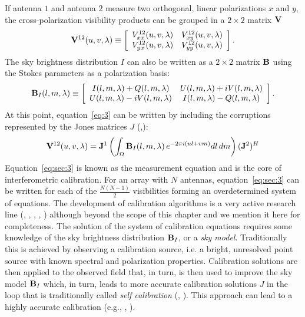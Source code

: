 If antenna $1$ and antenna $2$ measure two orthogonal, linear polarizations $x$ and $y$, the cross-polarization visibility products can be grouped in a $2 \times 2$ matrix ${\bf V}$
\begin{equation}
    {\bf V}^{12} (u,v,\lambda) \equiv 
    \left[ 
    \begin{array}{cc}
    V_{xx}^{12} (u,v,\lambda) & V_{xy}^{12} (u,v,\lambda) \\
    V_{yx}^{12} (u,v,\lambda) & V_{yy}^{12} (u,v,\lambda) \\
    \end{array}
    \right].   
\label{eq:sec:1}
\end{equation} 
The sky brightness distribution $I$ can also be written as a $2 \times 2$ matrix ${\bf B}$ using the Stokes parameters as a polarization basis:
\begin{equation}
    {\bf B}_I (l,m,\lambda) \equiv 
    \left[
    \begin{array}{cc}
    I (l,m,\lambda) + Q (l,m,\lambda) & U (l,m,\lambda) + iV (l,m,\lambda) \\
    U (l,m,\lambda) - iV (l,m,\lambda) & I (l,m,\lambda) - Q (l,m,\lambda) \\
    \end{array}
    \right].   
\label{eq:sec:2}
\end{equation} 
At this point, equation~\ref{eq:3} can be written by including the corruptions represented by the Jones matrices $J$ (\cite{hamaker96},\cite{smirnov11}):
\begin{equation}
{\bf V}^{12} (u,v,\lambda) = {\bf J}^1 \left( \int_\Omega {\bf B}_I (l, m, \lambda) \, e^{-2 \pi i (ul + vm)} dl \, dm  \right) ({\bf J}^2)^H
\label{eq:sec:3}
\end{equation} 
Equation~\ref{eq:sec:3} is known as the measurement equation and is the core of interferometric calibration. For an array with $N$ antennas, equation~\ref{eq:sec:3} can be written for each of the $\frac{N (N - 1)}{2}$ visibilities forming an overdetermined system of equations. The development of calibration algorithms is a very active research line (\cite{mitchell08}, \cite{kazemi11}, \cite{tasse14}, \cite{yatawatta15}, \cite{smirnov15}) although beyond the scope of this chapter and we mention it here for completeness.
The solution of the system of calibration equations requires some knowledge of the sky brightness distribution ${\bf B}_I$, or a {\it sky model}. Traditionally this is achieved by observing a calibration source, i.e. a bright, unresolved point source with known spectral and polarization properties. Calibration solutions are then applied to the observed field that, in turn, is then used to improve the sky model ${\bf B}_I$ which, in turn, leads to more accurate calibration solutions $J$ in the loop that is traditionally called {\it self calibration} (\cite{cornwell81}, \cite{pearson84}). This approach can lead to a highly accurate calibration (e.g., \cite{bernardi10}, \cite{smirnov11b}).

